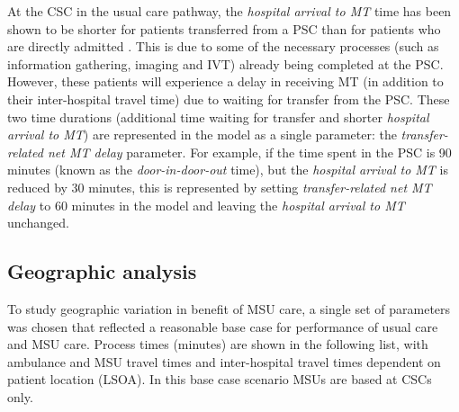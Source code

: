 At the CSC in the usual care pathway, the \emph{hospital arrival to MT} time has been shown to be shorter for patients transferred from a PSC than for patients who are directly admitted \cite{hassan_impact_2022}. This is due to some of the necessary processes (such as information gathering, imaging and IVT) already being completed at the PSC. However, these patients will experience a delay in receiving MT (in addition to their inter-hospital travel time) due to waiting for transfer from the PSC. These two time durations (additional time waiting for transfer and shorter \emph{hospital arrival to MT}) are represented in the model as a single parameter: the \emph{transfer-related net MT delay} parameter. For example, if the time spent in the PSC is 90 minutes (known as the \textit{door-in-door-out} time), but the \textit{hospital arrival to MT} is reduced by 30 minutes, this is represented by setting \textit{transfer-related net MT delay} to 60 minutes in the model and leaving the \emph{hospital arrival to MT} unchanged.

\subsection{Geographic analysis}

To study geographic variation in benefit of MSU care, a single set of parameters was chosen that reflected a reasonable base case for performance of usual care and MSU care. Process times (minutes) are shown in the following list, with ambulance and MSU travel times and inter-hospital travel times dependent on patient location (LSOA). In this base case scenario MSUs are based at CSCs only. 

\vspace{5mm}

